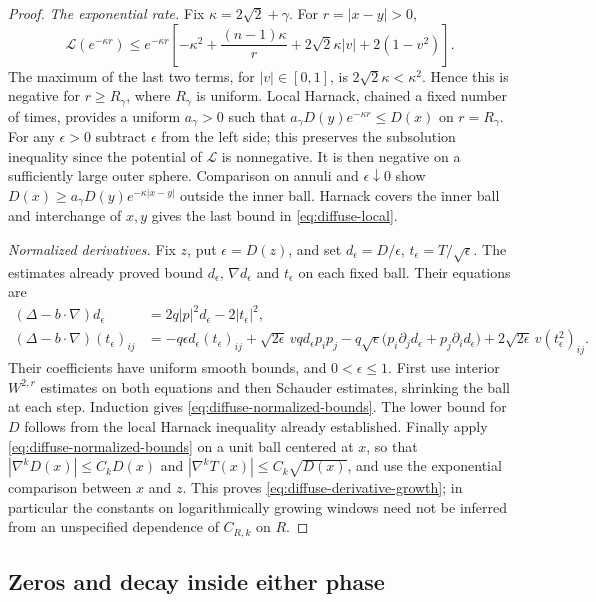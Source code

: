 \begin{proof}
\emph{The exponential rate.}
Fix $\kappa=2\sqrt2+\gamma$. For
$r=|x-y|>0$,
\[
 \mathcal L(e^{-\kappa r})\le e^{-\kappa r}
 \left[-\kappa^2+\frac{(n-1)\kappa}{r}
       +2\sqrt2\kappa|v|+2(1-v^2)\right].
\]
The maximum of the last two terms, for $|v|\in[0,1]$, is
$2\sqrt2\kappa<\kappa^2$. Hence this is negative for $r\ge R_\gamma$,
where $R_\gamma$ is uniform. Local Harnack, chained a fixed number of
times, provides a uniform $a_\gamma>0$ such that
$a_\gamma D(y)e^{-\kappa r}\le D(x)$ on $r=R_\gamma$.
For any $\epsilon>0$ subtract $\epsilon$ from the left side; this preserves
the subsolution inequality since the potential of $\mathcal L$ is
nonnegative. It is then negative on a sufficiently large outer sphere.
Comparison on annuli and $\epsilon\downarrow0$ show
$D(x)\ge a_\gamma D(y)e^{-\kappa|x-y|}$ outside the inner ball.
Harnack covers the inner ball and interchange of $x,y$ gives the last
bound in \eqref{eq:diffuse-local}.

\emph{Normalized derivatives.}
Fix $z$, put $\epsilon=D(z)$, and set
$d_\epsilon=D/\epsilon$, $t_\epsilon=T/\sqrt\epsilon$. The estimates
already proved bound $d_\epsilon$, $\nabla d_\epsilon$ and
$t_\epsilon$ on each fixed ball. Their equations are
\begin{align*}
 (\Delta-b\cdot\nabla)d_\epsilon
 &=2q|p|^2d_\epsilon-2|t_\epsilon|^2,\\
 (\Delta-b\cdot\nabla)(t_\epsilon)_{ij}
 &=-q\epsilon d_\epsilon(t_\epsilon)_{ij}
   +\sqrt{2\epsilon}\,vq d_\epsilon p_i p_j
   -q\sqrt\epsilon\big(p_i\partial_jd_\epsilon
                         +p_j\partial_id_\epsilon\big)
   +2\sqrt{2\epsilon}\,v(t_\epsilon^2)_{ij}.
\end{align*}
Their coefficients have uniform smooth bounds, and $0<\epsilon\le1$.
First use interior $W^{2,r}$ estimates on both equations and then
Schauder estimates, shrinking the ball at each step. Induction gives
\eqref{eq:diffuse-normalized-bounds}. The lower bound for $D$ follows
from the local Harnack inequality already established.
Finally apply \eqref{eq:diffuse-normalized-bounds} on a unit ball centered
at $x$, so that $|\nabla^kD(x)|\le C_kD(x)$ and
$|\nabla^kT(x)|\le C_k\sqrt{D(x)}$, and use the exponential comparison
between $x$ and $z$. This proves \eqref{eq:diffuse-derivative-growth}; in
particular the constants on logarithmically growing windows need not be
inferred from an unspecified dependence of $C_{R,k}$ on $R$.
\end{proof}

\subsection{Zeros and decay inside either phase}

